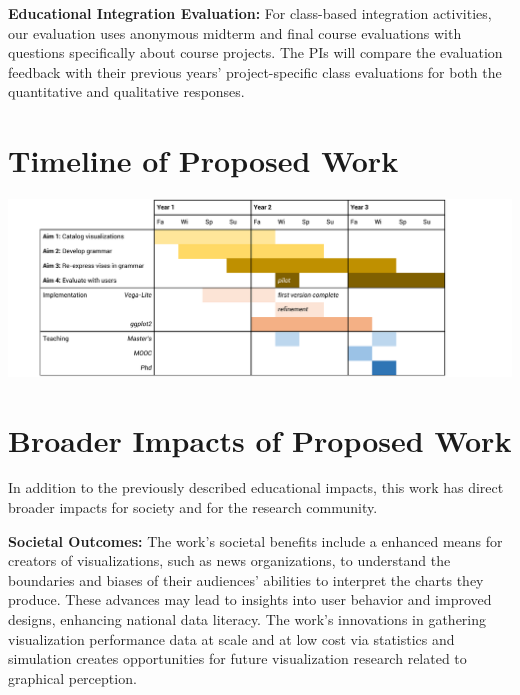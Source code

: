 \documentclass[11pt]{article}
\begin{document}
\noindent\textbf{Educational Integration Evaluation:}
For class-based integration activities, our evaluation uses anonymous midterm and final course evaluations with questions specifically about course projects.
The PIs will compare the evaluation feedback with their previous years' project-specific class evaluations for both the quantitative and qualitative responses.

\section{Timeline of Proposed Work}

\includegraphics[width=\columnwidth]{img/timeline}

\section{Broader Impacts of Proposed Work}

In addition to the previously described educational impacts, this work has direct broader impacts for society and for the research community.

\noindent\textbf{Societal Outcomes:}
The work's societal benefits include a enhanced means for creators of visualizations, such as news organizations, to understand the boundaries and biases of their audiences' abilities to interpret the charts they produce. 
These advances may lead to insights into user behavior and improved designs, enhancing national data literacy.
The work's innovations in gathering visualization performance data at scale and at low cost via statistics and simulation creates opportunities for future visualization research related to graphical perception.
\end{document}
